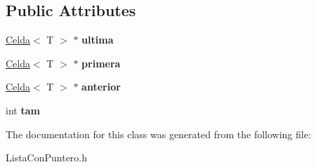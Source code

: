 \subsection*{Public Attributes}
\begin{DoxyCompactItemize}
\item 
\hypertarget{class_lista_con_puntero_abaaf8a6d544bb5762779a186886fce82}{\hyperlink{class_celda}{Celda}$<$ T $>$ $\ast$ {\bfseries ultima}}\label{class_lista_con_puntero_abaaf8a6d544bb5762779a186886fce82}

\item 
\hypertarget{class_lista_con_puntero_a46fe3edc08709d0821ed9d31a64d3ba0}{\hyperlink{class_celda}{Celda}$<$ T $>$ $\ast$ {\bfseries primera}}\label{class_lista_con_puntero_a46fe3edc08709d0821ed9d31a64d3ba0}

\item 
\hypertarget{class_lista_con_puntero_a38e52dfa7b49be4374147d28703e1226}{\hyperlink{class_celda}{Celda}$<$ T $>$ $\ast$ {\bfseries anterior}}\label{class_lista_con_puntero_a38e52dfa7b49be4374147d28703e1226}

\item 
\hypertarget{class_lista_con_puntero_a55db33fa3744c12d51bfadfd85f86dc5}{int {\bfseries tam}}\label{class_lista_con_puntero_a55db33fa3744c12d51bfadfd85f86dc5}

\end{DoxyCompactItemize}


The documentation for this class was generated from the following file\+:\begin{DoxyCompactItemize}
\item 
Lista\+Con\+Puntero.\+h\end{DoxyCompactItemize}
